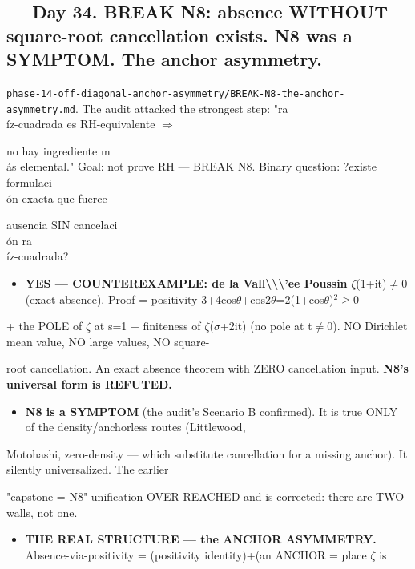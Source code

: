 \documentclass[10pt]{article}
\begin{document}
\subsection*{ --- Day 34. BREAK N8: absence WITHOUT square-root cancellation exists. N8 was a SYMPTOM. The anchor asymmetry.}
\texttt{phase-14-off-diagonal-anchor-asymmetry/BREAK-N8-the-anchor-asymmetry.md}. The audit attacked the strongest step: "ra\\\'iz-cuadrada es RH-equivalente \ensuremath{\Rightarrow}\par
no hay ingrediente m\\\'as elemental." Goal: not prove RH --- BREAK N8. Binary question: ?existe formulaci\\\'on exacta que fuerce\par
ausencia SIN cancelaci\\\'on ra\\\'iz-cuadrada?\par
\begin{itemize}
\item \textbf{YES --- COUNTEREXAMPLE: de la Vall\textbackslash{}\textbackslash{}\textbackslash{}'ee Poussin} \ensuremath{\zeta}(1+it)\ensuremath{\ne}0 (exact absence). Proof = positivity 3+4cos\ensuremath{\theta}+cos2\ensuremath{\theta}=2(1+cos\ensuremath{\theta})\ensuremath{^2}\ensuremath{\ge}0
\end{itemize}
  + the POLE of \ensuremath{\zeta} at s=1 + finiteness of \ensuremath{\zeta}(\ensuremath{\sigma}+2it) (no pole at t\ensuremath{\ne}0). NO Dirichlet mean value, NO large values, NO square-\par
  root cancellation. An exact absence theorem with ZERO cancellation input. \textbf{N8's universal form is REFUTED.}\par
\begin{itemize}
\item \textbf{N8 is a SYMPTOM} (the audit's Scenario B confirmed). It is true ONLY of the density/anchorless routes (Littlewood,
\end{itemize}
  Motohashi, zero-density --- which substitute cancellation for a missing anchor). It silently universalized. The earlier\par
  "capstone = N8" unification OVER-REACHED and is corrected: there are TWO walls, not one.\par
\begin{itemize}
\item \textbf{THE REAL STRUCTURE --- the ANCHOR ASYMMETRY.} Absence-via-positivity = (positivity identity)+(an ANCHOR = place \ensuremath{\zeta} is
\end{itemize}
\end{document}
